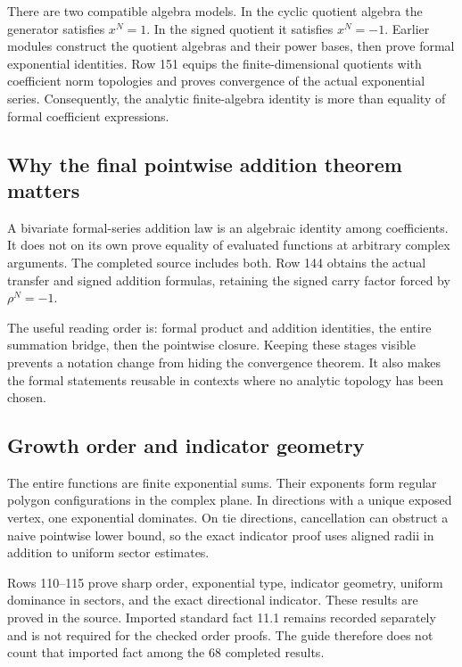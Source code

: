 There are two compatible algebra models. In the cyclic quotient algebra the generator satisfies $x^N=1$. In the signed quotient it satisfies $x^N=-1$. Earlier modules construct the quotient algebras and their power bases, then prove formal exponential identities. Row 151 equips the finite-dimensional quotients with coefficient norm topologies and proves convergence of the actual exponential series. Consequently, the analytic finite-algebra identity is more than equality of formal coefficient expressions.

\subsection{Why the final pointwise addition theorem matters}
A bivariate formal-series addition law is an algebraic identity among coefficients. It does not on its own prove equality of evaluated functions at arbitrary complex arguments. The completed source includes both. Row 144 obtains the actual transfer and signed addition formulas, retaining the signed carry factor forced by $\rho^N=-1$.

The useful reading order is: formal product and addition identities, the entire summation bridge, then the pointwise closure. Keeping these stages visible prevents a notation change from hiding the convergence theorem. It also makes the formal statements reusable in contexts where no analytic topology has been chosen.

\subsection{Growth order and indicator geometry}
The entire functions are finite exponential sums. Their exponents form regular polygon configurations in the complex plane. In directions with a unique exposed vertex, one exponential dominates. On tie directions, cancellation can obstruct a naive pointwise lower bound, so the exact indicator proof uses aligned radii in addition to uniform sector estimates.

Rows 110--115 prove sharp order, exponential type, indicator geometry, uniform dominance in sectors, and the exact directional indicator. These results are proved in the source. Imported standard fact 11.1 remains recorded separately and is not required for the checked order proofs. The guide therefore does not count that imported fact among the 68 completed results.
